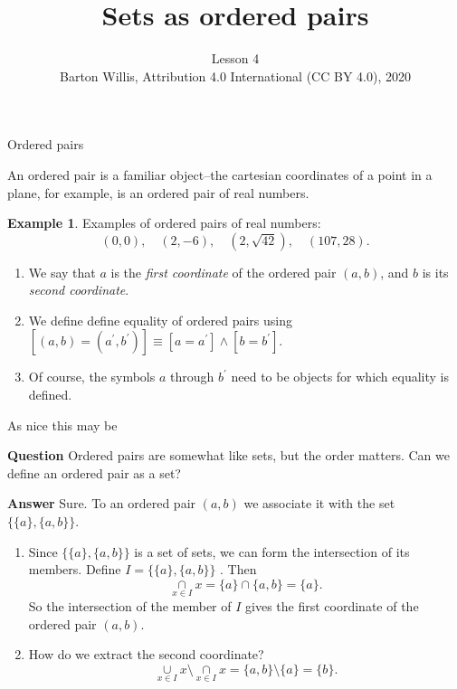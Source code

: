 \documentclass[fleqn]{beamer}
\subtitle{Lesson 4 \\
\vspace{1.0in}
 \tiny Barton Willis, Attribution 4.0 International (CC BY 4.0), 2020 \normalsize}
\title{\textbf{Sets as ordered pairs}}
\date{}
\theoremstyle{definition}
\newtheorem{myex}{Example}
\newenvironment{checklist}{
  \begin{enumerate}[\ding{51}]
    \addtolength{\itemsep}{-0.0\itemsep}}
  {\end{enumerate}}
\begin{document}
\frame{\titlepage}

\begin{frame}{Ordered pairs}

An ordered pair is a familiar object--the cartesian coordinates of a point in a plane, for example, is an ordered pair of real numbers.

\begin{myex}
Examples of ordered pairs of real numbers:
\[
    (0,0), \quad (2,-6),  \quad  (2, \sqrt{42}), \quad   (107, 28).
\]
\end{myex}

\begin{checklist}

\item We say that \(a\) is the \emph{first coordinate} of the ordered pair \((a,b)\), and \(b\) is its \emph{second coordinate}.

\item  We define define equality of ordered pairs using   \([ (a,b) = (a^\prime, b^\prime)]   \equiv  [a = a^\prime] \land  [b = b^\prime] \).

\item Of course, the symbols \(a\) through \(b^\prime\) need to be objects for which equality is defined.
\end{checklist}

\end{frame}
\begin{frame}{As nice this may be}

\textbf{Question} Ordered pairs are somewhat like sets, but the order matters.  Can we define an ordered pair as a set?

\textbf{Answer}   Sure.  To an ordered pair \((a,b)\) we associate it with the set  \(\{\{a\}, \{a,b\}\} \).

\vspace{0.2in}

\begin{checklist}

\item Since \(\{\{a\}, \{a,b\}\} \) is  a set of sets, we can form the intersection of its members. Define  \(I = \{\{a\}, \{a,b\}\} \) . Then
\[
   \underset{x \in I}{\cap} x =  \{a\} \cap \{a,b\} = \{a\}.
\]
So the intersection of the member of \(I\) gives the first coordinate of the ordered pair \((a,b)\).

\item How do we extract the second coordinate?
\[
    \underset{x \in I}{\cup} x   \setminus \underset{x \in I}{\cap} x  = \{a,b\} \setminus \{a\} = \{b\}.
\]



\end{checklist}


\end{frame}
\end{document}
